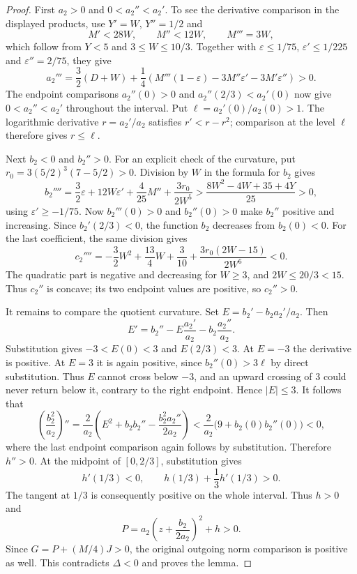 \begin{proof}
First $a_2>0$ and $0<a_2''<a_2'$. To see the derivative comparison
in the displayed products, use $Y'=W$, $Y''=1/2$ and
\[
 M'<28W,\qquad M''<12W,\qquad M'''=3W,
\]
which follow from $Y<5$ and $3\le W\le10/3$.
Together with $\varepsilon\le1/75$, $\varepsilon'\le1/225$ and
$\varepsilon''=2/75$, they give
\[
 a_2'''=\frac32(D+W)+\frac14\left(
 M'''(1-\varepsilon)-3M''\varepsilon'-3M'\varepsilon''\right)>0.
\]
The endpoint comparisons $a_2''(0)>0$ and $a_2''(2/3)<a_2'(0)$
now give $0<a_2''<a_2'$ throughout the interval.
Put $\ell=a_2'(0)/a_2(0)>1$.
The logarithmic derivative $r=a_2'/a_2$ satisfies $r'<r-r^2$;
comparison at the level $\ell$ therefore gives $r\le\ell$.

Next $b_2<0$ and $b_2''>0$. For an explicit check of the curvature,
put $r_0=3(5/2)^3(7-5/2)>0$. Division by $W$ in the formula for
$b_2$ gives
\[
 b_2''''=\frac32\varepsilon+12W\varepsilon'
             +\frac4{25}M''+\frac{3r_0}{2W^5}
 >\frac{8W^2-4W+35+4Y}{25}>0,
\]
using $\varepsilon'\ge-1/75$.
Now $b_2'''(0)>0$ and $b_2''(0)>0$ make $b_2''$ positive and increasing.
Since $b_2'(2/3)<0$, the function $b_2$ decreases from $b_2(0)<0$.
For the last coefficient, the same division gives
\[
 c_2''''=-\frac32W^2+\frac{13}4W+\frac3{10}
              +\frac{3r_0(2W-15)}{2W^6}<0.
\]
The quadratic part is negative and decreasing for $W\ge3$, and
$2W\le20/3<15$. Thus $c_2''$ is concave; its two endpoint values
are positive, so $c_2''>0$.

It remains to compare the quotient curvature. Set
$E=b_2'-b_2a_2'/a_2$. Then
\[
 E'=b_2''-E\frac{a_2'}{a_2}-b_2\frac{a_2''}{a_2}.
\]
Substitution gives $-3<E(0)<3$ and $E(2/3)<3$.
At $E=-3$ the derivative is positive. At $E=3$ it is again positive,
since $b_2''(0)>3\ell$ by direct substitution.
Thus $E$ cannot cross below $-3$, and an upward crossing of $3$ could
never return below it, contrary to the right endpoint. Hence $|E|\le3$.
It follows that
\[
 \left(\frac{b_2^2}{a_2}\right)''
 =\frac2{a_2}\left(E^2+b_2b_2''-
                    \frac{b_2^2a_2''}{2a_2}\right)
 <\frac2{a_2}\bigl(9+b_2(0)b_2''(0)\bigr)<0,
\]
where the last endpoint comparison again follows by substitution.
Therefore $h''>0$. At the midpoint of $[0,2/3]$, substitution gives
\[
 h'(1/3)<0,\qquad h(1/3)+\frac13h'(1/3)>0.
\]
The tangent at $1/3$ is consequently positive on the whole interval.
Thus $h>0$ and
\[
 P=a_2\left(z+\frac{b_2}{2a_2}\right)^2+h>0.
\]
Since $G=P+(M/4)J>0$, the original outgoing norm comparison is
positive as well. This contradicts $\Delta<0$ and proves the lemma.
\end{proof}

